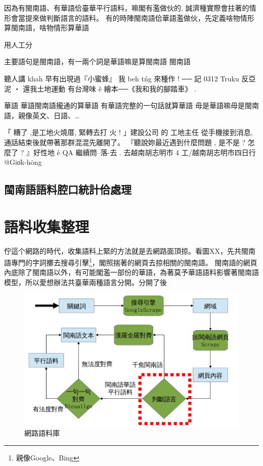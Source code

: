 因為有閩南語、有華語佮臺華平行語料，嘛閣有濫做伙的, 誠濟種實際會拄著的情形會當提來做判斷語言的語料。
有的時陣閩南語佮華語濫做伙，先定義啥物情形算閩南語，啥物情形算華語

用人工分

主要語句是閩南語，有一兩个詞是華語嘛是算閩南語
閩南語

聽人講 khah 早有出現過『小蜜蜂』
我 beh tńg 來種作 ! ── 記 0312 Truku 反亞泥 ‧ 還我土地運動
有台灣味 ê 繪本──《我和我的腳踏車》 .

華語
華語閩南語攏通的算華語
有華語完整的一句話就算華語
毋是華語嘛毋是閩南語，親像英文、日語、…

「 糟了 ,是工地火燒厝, 緊轉去打 火 ! 」建設公司 的 工地主任 從手機接到消息,通話結束後就帶著那群混混先離開了。
『聽說妳最近遇到什麼問題 , 是不是 ? 怎麼了 ? 』好性地 ê QA 繼續問--落-去 .
去越南胡志明市 4 工/越南胡志明市四日行 @Gio̍k-hōng

\subsection{閩南語語料腔口統計佮處理}
\label{小節：閩南語語料腔口統計佮處理}

\section{語料收集整理}
\label{節：語料收集整理}
佇這个網路的時代，收集語料上緊的方法就是去網路面頂掠。看圖XX，先共閩南語專門的字詞擲去搜尋引擊\footnote{親像Google、Bing}，閣照揣著的網頁去掠相關的閩南語。
閩南語的網頁內底除了閩南語以外，有可能閣濫一部份的華語，為著莫予華語語料影響著閩南語模型，所以愛想辦法共臺華兩種語言分開。分開了後


\begin{figure}
\centerline{\includegraphics[keepaspectratio,width=40em]{圖/網路語料庫結構}}
\caption{網路語料庫}
\label{圖：網路語料庫結構}
\end{figure}

